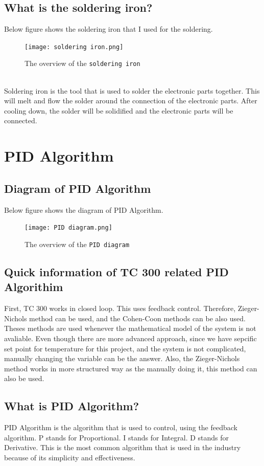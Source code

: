\documentclass{article}
\begin{document}
\subsection{What is the soldering iron?}
Below figure shows the soldering iron that I used for the soldering.
\begin{figure}[htpb]
    \centering
    \texttt{[image: soldering iron.png]}
    \caption{The overview of the \texttt{soldering iron}}
    \label{fig:s_r}
\end{figure}
\\
Soldering iron is the tool that is used to solder the electronic parts together.
This will melt and flow the solder around the connection of the electronic parts.
After cooling down, the solder will be solidified and the electronic parts will be connected.

\section{PID Algorithm}
\subsection{Diagram of PID Algorithm}
Below figure shows the diagram of PID Algorithm.
\begin{figure}[htpb]
    \centering
    \texttt{[image: PID diagram.png]}
    \caption{The overview of the \texttt{PID diagram}}
    \label{fig:s_r}
\end{figure}
\subsection{Quick information of TC 300 related PID Algorithim}
First, TC 300 works in closed loop. This uses feedback control.
Therefore, Zieger-Nichols method can be used, and the Cohen-Coon methods can be also used.
Theses methods are used whenever the mathematical model of the system is not avaliable. 
Even though there are more advanced approach, since we have sepcific set point for temperature for this project,
and the system is not complicated, manually changing the variable can be the answer. 
Also, the Zieger-Nichols method works in more structured way as the manually doing it, this method can also 
be used. 
\subsection{What is PID Algorithm?}
PID Algorithm is the algorithm that is used to control, using the feedback algorithm.
P stands for Proportional.
I stands for Integral.
D stands for Derivative.
This is the most common algorithm that is used in the industry because of its simplicity and effectiveness.
\end{document}
